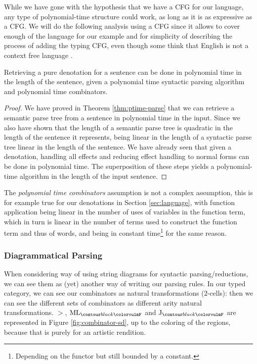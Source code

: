 While we have gone with the hypothesis that we have a CFG for our language,
any type of polynomial-time structure could work, as long as it is as
expressive as a CFG.
We will do the following analysis using a CFG since it allows to cover enough
of the language for our example and for simplicity of describing the process of
adding the typing CFG, even though some think that English is not a context
free language \cite{higginbothamEnglishNotContextFree1984}.

\begin{thm}
	\label{thm:ptime-denot}
	Retrieving a pure denotation for a sentence can be done in polynomial time in
	the length of the sentence, given a polynomial time syntactic parsing
	algorithm and polynomial time combinators.
\end{thm}
\begin{proof}
	We have proved in Theorem \ref{thm:ptime-parse} that we can retrieve a
	semantic parse tree from a	sentence in polynomial time in the input.
	Since we also have shown that the length of a semantic parse tree is quadratic
	in the length of the sentence it represents, being linear in the length of a
	syntactic parse tree linear in the length of the sentence.
	We have already seen that given a denotation, handling all effects and
	reducing effect handling to normal forms can be done in polynomial time.
	The superposition of these steps yields a polynomial-time algorithm in the
	length of the input sentence.
\end{proof}

The \emph{polynomial time combinators} assumption is not a complex assumption,
this is for example true for our denotations in Section \ref{sec:language},
with function application being linear in the number of uses of variables in
the function term, which in turn is linear in the number of terms used to
construct the function term and thus of words, and \fmap being in constant
time\footnote{Depending on the functor but still bounded by a constant.} for
the same reason.

\subsubsection{Diagrammatical Parsing}
\label{subsubsec:diagram-parsing}
When considering \cite{coeckeMathematicalFoundationsCompositional2010}
way of using string diagrams for syntactic parsing/reductions, we can see them
as (yet) another way of writing our parsing rules.
In our typed category, we can see our combinators as natural
transformations ($2$-cells): then we can see the different sets of combinators
as different arity natural transformations.
$>$, $\combML_{\f{F}}$ and $\combJ_{\f{F}}$ are represented in
Figure \ref{fig:combinator-sd}, up to the coloring of the regions, because that
is purely for an artistic rendition.

